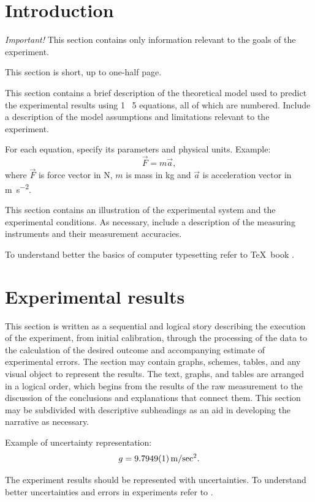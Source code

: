 \documentclass[a4paper,12pt]{article}
\begin{document}
\section{Introduction}

\emph{Important!} This section contains only information relevant to the goals of the experiment. 

This section is short, up to one-half page.

This section contains a brief description of the theoretical model used to predict the experimental results using 1 \textendash \  5 equations, all of which are numbered. Include a description of the model assumptions and limitations relevant to the experiment.

For each equation, specify its parameters and physical units. Example:
\begin{equation} \label{eq1}
\vec{F} = m \vec{a},
\end{equation}
where $\vec{F}$ is force vector in \unit{\newton}, $m$ is mass in \unit{\kilogram} and $\vec{a}$ is acceleration vector in \unit{\meter\per\s\squared}.

This section contains an illustration of the experimental system and the experimental conditions. As necessary, include a description of the measuring instruments and their measurement accuracies. 

To understand better the basics of computer typesetting refer to \TeX \ book \cite{KhuthTeX}.

\section{Experimental results}

This section is written as a sequential and logical story describing the execution of the experiment, from initial calibration, through the processing of the data to the calculation of the desired outcome and accompanying estimate of experimental errors.  The section may contain graphs, schemes, tables, and any visual object to represent the results.  The text, graphs, and tables are arranged in a logical order, which begins from the results of the raw measurement to the discussion of the conclusions and explanations that connect them. This section may be subdivided with descriptive subheadings as an aid in developing the narrative as necessary.

Example of uncertainty representation: 
$$
g = \qty{9.7949(1)}{\meter\per\sec\squared}.
$$

The experiment results should be represented with uncertainties. To understand better uncertainties and errors in experiments refer to \cite{Tailor01}.
\end{document}
